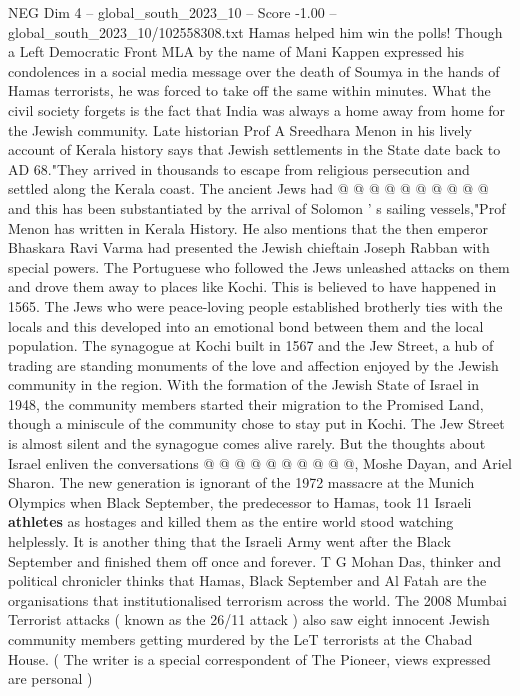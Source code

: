 \begin{textsample}{NEG Dim 4 – global\_south\_2023\_10 – Score -1.00 – global\_south\_2023\_10/102558308.txt}
Hamas helped him win the polls!
Though a Left Democratic Front MLA by the name of Mani Kappen expressed his condolences in a social media message over the death of Soumya in the hands of Hamas terrorists, he was forced to take off the same within minutes.
What the civil society forgets is the fact that India was always a home away from home for the Jewish community.
Late historian Prof A Sreedhara Menon in his lively account of Kerala history says that Jewish settlements in the State date back to AD 68."They arrived in thousands to escape from religious persecution and settled along the Kerala coast.
The ancient Jews had @ @ @ @ @ @ @ @ @ @ and this has been substantiated by the arrival of Solomon ' s sailing vessels,"Prof Menon has written in Kerala History.
He also mentions that the then emperor Bhaskara Ravi Varma had presented the Jewish chieftain Joseph Rabban with special powers.
The Portuguese who followed the Jews unleashed attacks on them and drove them away to places like Kochi.
This is believed to have happened in 1565.
The Jews who were peace-loving people established brotherly ties with the locals and this developed into an emotional bond between them and the local population.
The synagogue at Kochi built in 1567 and the Jew Street, a hub of trading are standing monuments of the love and affection enjoyed by the Jewish community in the region.
With the formation of the Jewish State of Israel in 1948, the community members started their migration to the Promised Land, though a miniscule of the community chose to stay put in Kochi.
The Jew Street is almost silent and the synagogue comes alive rarely.
But the thoughts about Israel enliven the conversations @ @ @ @ @ @ @ @ @ @, Moshe Dayan, and Ariel Sharon.
The new generation is ignorant of the 1972 massacre at the Munich Olympics when Black September, the predecessor to Hamas, took 11 Israeli \textbf{athletes} as hostages and killed them as the entire world stood watching helplessly.
It is another thing that the Israeli Army went after the Black September and finished them off once and forever.
T G Mohan Das, thinker and political chronicler thinks that Hamas, Black September and Al Fatah are the organisations that institutionalised terrorism across the world.
The 2008 Mumbai Terrorist attacks ( known as the 26/11 attack ) also saw eight innocent Jewish community members getting murdered by the LeT terrorists at the Chabad House. ( The writer is a special correspondent of The Pioneer, views expressed are personal )

\end{textsample}
